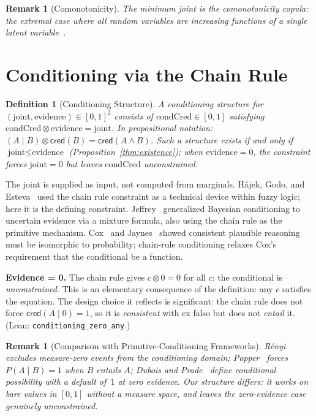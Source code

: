\documentclass[11pt,a4paper]{article}
\newtheorem{definition}[theorem]{Definition}
\newtheorem{remark}[theorem]{Remark}
\newcommand{\cred}{\mathsf{cred}}
\newcommand{\conjc}{\otimes}
\newcommand{\condc}[2]{({#1} \mid {#2})}
\begin{document}
\begin{remark}[Comonotonicity]
The minimum joint is the \emph{comonotonicity copula}: the extremal case
where all random variables are increasing functions of a single latent
variable~\cite{dhaene2002,nelsen2006}.
\end{remark}

\section{Conditioning via the Chain Rule}
\label{sec:conditioning}

\begin{definition}[Conditioning Structure]
\label{def:conditioning}
A \emph{conditioning structure} for
$(\text{joint}, \text{evidence}) \in [0,1]^2$
consists of $\text{condCred} \in [0,1]$ satisfying
$\text{condCred} \conjc \text{evidence} = \text{joint}$.
In propositional notation:
$\condc{A}{B} \conjc \cred(B) = \cred(A \land B)$.
Such a structure exists if and only if
$\text{joint} \leq \text{evidence}$
(Proposition~\ref{thm:existence}); when $\text{evidence} = 0$, the
constraint forces $\text{joint} = 0$ but leaves $\text{condCred}$
unconstrained.
\end{definition}

The joint is supplied as input, not computed from marginals.
H\'ajek, Godo, and Esteva~\cite{hajek1995} used the chain rule constraint
as a technical device within fuzzy logic; here it is the defining constraint.
Jeffrey~\cite{jeffrey1965} generalized Bayesian conditioning to uncertain
evidence via a mixture formula, also using the chain rule as the primitive
mechanism.
Cox~\cite{cox1961} and Jaynes~\cite{jaynes2003} showed consistent
plausible reasoning must be isomorphic to probability; chain-rule
conditioning relaxes Cox's requirement that the conditional be a function.

\textbf{Evidence = 0.}
The chain rule gives $c \conjc 0 = 0$ for all $c$: the conditional is
\emph{unconstrained}.
This is an elementary consequence of the definition: any $c$ satisfies
the equation. The design choice it reflects is significant:
the chain rule does not force $\cred(A \mid 0) = 1$, so it is
\emph{consistent} with ex falso but does not \emph{entail} it.
(Lean: \texttt{conditioning\_zero\_any}.)

\begin{remark}[Comparison with Primitive-Conditioning Frameworks]
\label{rem:primitive-conditioning}
R\'enyi~\cite{renyi1955} excludes measure-zero events from the
conditioning domain; Popper~\cite{popper1959} forces
$P(A \mid B) = 1$ when $B$ entails $A$;
Dubois and Prade~\cite{dubois1988} define conditional possibility
with a default of~$1$ at zero evidence.
Our structure differs: it works on bare values in $[0,1]$ without a
measure space, and leaves the zero-evidence case genuinely
unconstrained.
\end{remark}
\end{document}
